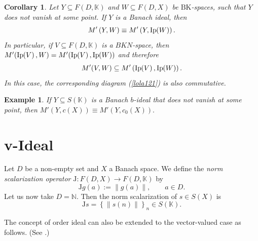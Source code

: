\documentclass[14pt, a4paper]{article}  %
\providecommand{\llave}[1]{\left\lbrace #1\right\rbrace }
\providecommand{\pare}[1]{\left( #1\right) }
\providecommand{\norm}[1]{\left\lVert#1\right\rVert}
\newcommand{\tien}{\rightarrow}
\newcommand{\K}{\mathbb{K}}
\newcommand{\N}{\mathbb{N}}
\newcommand{\BK}{\text{BK}}
\newcommand{\J}{\mathrm{J}}
\newcommand{\Mt}{M'}
\newtheorem{corollary}{Corollary}[section]
\newtheorem{example}{Example}[section]  %
\begin{document}
\begin{corollary}\label{d332_3}
	Let $Y \subseteq F\pare{D,\K}$ and $W \subseteq F\pare{D,X}$ be $\BK$-spaces, such that $Y$ does not vanish at some point. If $Y$ is a Banach ideal, then  
	\begin{equation}
		\Mt\pare{Y,W}\equiv \Mt\pare{Y,\textnormal{Ip}\hspace{-2pt}\pare{W}}.
	\end{equation} 
	 In particular, if $V\subseteq F\pare{D,\K}$ is a $BKN$-space, then
	$M'(\textnormal{Ip}\hspace{-2pt}\pare{V}, W) = M'(\textnormal{Ip}\hspace{-2pt}\pare{V}, \textnormal{Ip}\hspace{-2pt}\pare{W})$ and therefore \begin{equation}
		M'(V,W) \subseteq  M'\pare{\textnormal{Ip}\hspace{-2pt}\pare{V}, \textnormal{Ip}\hspace{-2pt}\pare{W}}.
	\end{equation}
	In this case, the corresponding diagram (\ref{lola121}) is also commutative.
\end{corollary} 

\begin{example}\label{d282_1} \label{d216_1}
	If $Y\subseteq S\pare{\K}$ is a Banach $b$-ideal that does not vanish at some point, then  
	$\Mt\pare{Y, c\pare{X}}\equiv \Mt\pare{Y,c_{0}\pare{X}}.$
\end{example}

 



 	\section{v-Ideal}\label{lalo1}\label{pop8}
 	
 		Let $D$ be a non-empty set and $X$ a Banach space. We define the \emph{norm scalarization operator}
 	$\J:F(D,X)\tien F(D,\K)$  by
 	\begin{equation}\label{q20_0}
 		\J g(a):=\norm{g(a)},\qquad a\in D.
 	\end{equation} 
 	Let us now take $D = \N$. Then the norm scalarization of $s \in S(X)$ is
 	\begin{equation}
 		\J s=\llave{\norm{s(n)}}_{n}\in  S(\K).
 	\end{equation}  
 	
 	The concept of order ideal can also be extended to  the vector-valued case as follows. (See \cite[p.~800]{V}.)
 
\end{document}
